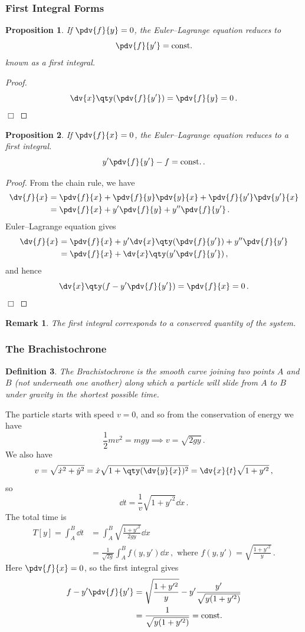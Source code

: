\documentclass{article}
\theoremstyle{plain}\theoremheaderfont{\normalfont\itshape}\theorembodyfont{\rmfamily}\theoremseparator{.}\newtheorem*{rem}{Remark}\newtheorem*{ex}{Example}\newtheorem*{proof}{Proof}\newtheorem*{altp}{Alternative proof}
\theoremstyle{plain}\theoremheaderfont{\normalfont\bfseries}\theorembodyfont{\rmfamily}\theoremseparator{.}\newtheorem{thm}{Theorem}[section]\newtheorem{lem}[thm]{Lemma}\newtheorem{prop}[thm]{Proposition}\newtheorem*{cor}{Corollary}\newtheorem{defn}[thm]{Definition}\newtheorem{clm}[thm]{Claim}\newtheorem{clminproof}{Claim}
\theoremstyle{break}\theoremheaderfont{\normalfont\itshape}\theorembodyfont{\rmfamily}\theoremseparator{.\medskip}\newtheorem*{proofskip}{Proof}\newtheorem*{exs}{Examples}\newtheorem*{rems}{Remarks}
\theoremstyle{break}\theoremheaderfont{\normalfont\bfseries}\theorembodyfont{\rmfamily}\theoremseparator{.\medskip}\newtheorem{lemskip}[thm]{Lemma}\newtheorem{defnskip}[thm]{Definition}\newtheorem{propskip}[thm]{Proposition}\newtheorem{thmskip}[thm]{Theorem}
\numberwithin{equation}{section}
\newcommand{\qed}{\hfill\ensuremath{\Box}}
\begin{document}
	\subsubsection{First Integral Forms}
	\begin{prop}
		If \(\pdv{f}{y}=0\), the Euler--Lagrange equation reduces to
		\[\pdv{f}{y'}=\text{const.}\]
		known as a \textit{first integral}.
	\end{prop}
	\begin{proof}
		\[\dv{x}\qty(\pdv{f}{y'})=\pdv{f}{y}=0\,.\]\qed
	\end{proof}
	\begin{prop}
		If \(\pdv{f}{x}=0\), the Euler--Lagrange equation reduces to a \textit{first integral}.
		\[y'\pdv{f}{y'}-f=\text{const.}\,.\]
	\end{prop}
	\begin{proof}
		From the chain rule, we have
		\begin{align*}\dv{f}{x}&=\pdv{f}{x}+\pdv{f}{y}\pdv{y}{x}+\pdv{f}{y'}\pdv{y'}{x}\\
		&=\pdv{f}{x}+y'\pdv{f}{y}+y''\pdv{f}{y'}\,.
		\end{align*}
		Euler--Lagrange equation gives
		\begin{align*}
			\dv{f}{x}&=\pdv{f}{x}+y'\dv{x}\qty(\pdv{f}{y'})+y''\pdv{f}{y'}\\
			&=\pdv{f}{x}+\dv{x}\qty(y'\pdv{f}{y'})\,,
		\end{align*}
		and hence
		\[\dv{x}\qty(f-y'\pdv{f}{y'})=\pdv{f}{x}=0\,.\]\qed
	\end{proof}
	\begin{rem}
		The first integral corresponds to a conserved quantity of the system.
	\end{rem}


	\subsubsection{The Brachistochrone}
	\begin{defn}
		The \textit{Brachistochrone} is the smooth curve joining two points \(A\) and \(B\) (not underneath one another) along which a particle will slide from \(A\) to \(B\) under gravity in the shortest possible time.
	\end{defn}

	The particle starts with speed \(v=0\), and so from the conservation of energy we have
	\[\frac{1}{2}mv^2=mgy\implies v=\sqrt{2gy}\,.\]
	We also have
	\[v=\sqrt{\dot{x}^2+\dot{y}^2}=\dot{x}\sqrt{1+\qty(\dv{y}{x})^2}=\dv{x}{t}\sqrt{1+y'^2}\,,\]
	so
	\[\dd{t}=\frac{1}{v}\sqrt{1+y'^2}\dd{x}\,.\]
	The total time is
	\begin{align*}
		T[y]=\int_{A}^{B}\dd{t}&=\int_{A}^{B}\sqrt{\frac{1+y'^2}{2gy}}\dd{x}\\
		&=\frac{1}{\sqrt{2g}}\int_{A}^{B}f(y,y')\dd{x}\,,\text{ where }f(y,y')=\sqrt{\frac{1+y'^2}{y}}\,.
	\end{align*}
	Here \(\pdv{f}{x}=0\), so the first integral gives
	\begin{align*}
		f-y'\pdv{f}{y'}&=\sqrt{\frac{1+y'^2}{y}}-y'\frac{y'}{\sqrt{y(1+y'^2)}}\\
		&=\frac{1}{\sqrt{y(1+y'^2)}}=\text{const.}
	\end{align*}
	
\end{document}
